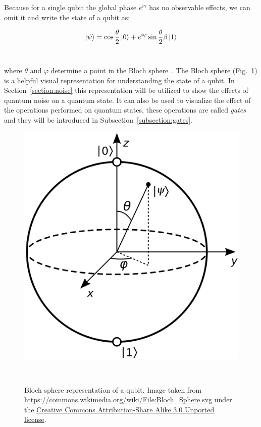 Because for a single qubit the global phase \(e^{i\gamma}\) has no
observable effects, we can omit it and write the state of a qubit as: \

\begin{equation}\label{eq:qubit_bloch}
  \ket{\psi} = \cos{\frac{\theta}{2}}\ket{0} + e^{i\varphi}\sin{\frac{\theta}{2}}\beta\ket{1}
\end{equation} \

where \(\theta\) and \(\varphi\) determine a point in the Bloch
sphere~\cite{bloch_nuclear_1946}. The Bloch sphere (Fig.~\ref{fig:bloch_sphere})
is a helpful visual representation for understanding the state of a
qubit. In Section~\ref{section:noise} this representation will be
utilized to show the effects of quantum noise on a quantum state. It
can also be used to visualize the effect of the operations performed
on quantum states, these operations are called \textit{gates} and 
they will be introduced in Subsection~\ref{subsection:gates}. \

\begin{figure}[ht]
  \includegraphics[scale=0.1]{figures/Bloch_sphere.png}
  \centering
  \caption{Bloch sphere representation of a qubit. Image taken from \href{https://commons.wikimedia.org/wiki/File:Bloch_Sphere.svg}{https://commons.wikimedia.org/wiki/File:Bloch\_Sphere.svg} under the \href{https://en.wikipedia.org/wiki/Creative_Commons}{Creative Commons Attribution-Share Alike 3.0 Unported license}.}
~\label{fig:bloch_sphere}
\end{figure} \

